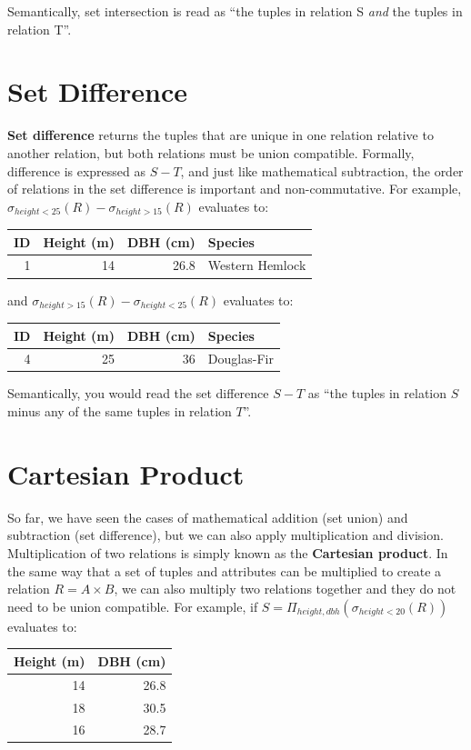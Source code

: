 \documentclass[
]{book}
\begin{document}
Semantically, set intersection is read as ``the tuples in relation S \emph{and} the tuples in relation T''.

\section{Set Difference}\label{set-difference}

\textbf{Set difference} returns the tuples that are unique in one relation relative to another relation, but both relations must be union compatible. Formally, difference is expressed as \(S-T\), and just like mathematical subtraction, the order of relations in the set difference is important and non-commutative. For example, \(σ_{height<25}(R)-σ_{height>15}(R)\) evaluates to:

\begin{tabular}{rrrl}
\toprule
ID & Height (m) & DBH (cm) & Species\\
\midrule
1 & 14 & 26.8 & Western Hemlock\\
\bottomrule
\end{tabular}

and \(σ_{height>15}(R)-σ_{height<25}(R)\) evaluates to:

\begin{tabular}{rrrl}
\toprule
ID & Height (m) & DBH (cm) & Species\\
\midrule
4 & 25 & 36 & Douglas-Fir\\
\bottomrule
\end{tabular}

Semantically, you would read the set difference \(S-T\) as ``the tuples in relation \(S\) minus any of the same tuples in relation \(T\)''.

\section{Cartesian Product}\label{cartesian-product}

So far, we have seen the cases of mathematical addition (set union) and subtraction (set difference), but we can also apply multiplication and division. Multiplication of two relations is simply known as the \textbf{Cartesian product}. In the same way that a set of tuples and attributes can be multiplied to create a relation \(R=A×B\), we can also multiply two relations together and they do not need to be union compatible. For example, if \(S = Π_{height,dbh}(σ_{height<20}(R))\) evaluates to:

\begin{tabular}{rr}
\toprule
Height (m) & DBH (cm)\\
\midrule
14 & 26.8\\
18 & 30.5\\
16 & 28.7\\
\bottomrule
\end{tabular}
\end{document}
